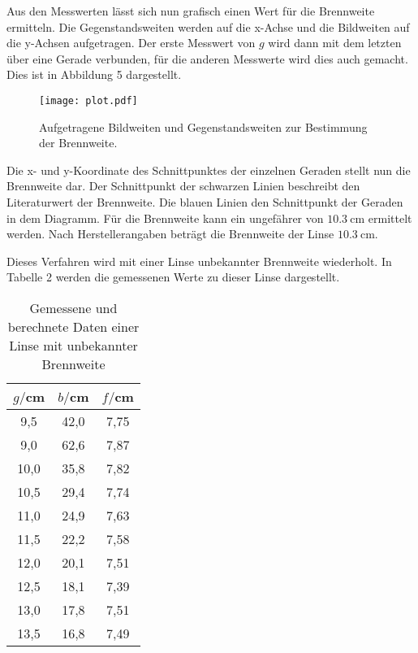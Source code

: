 Aus den Messwerten lässt sich nun grafisch einen Wert für die Brennweite ermitteln. Die Gegenstandsweiten
werden auf die x-Achse und die Bildweiten auf die y-Achsen aufgetragen. Der erste Messwert von $g$ wird dann mit
dem letzten über eine Gerade verbunden, für die anderen Messwerte wird dies auch gemacht. Dies ist in
Abbildung 5 dargestellt.




\begin{figure}[H]
  \centering
  \texttt{[image: plot.pdf]}
  \caption{Aufgetragene Bildweiten und Gegenstandsweiten zur Bestimmung der Brennweite.}
  \label{fig:plot}
\end{figure}


Die x- und y-Koordinate des Schnittpunktes der einzelnen Geraden stellt nun die Brennweite dar.
Der Schnittpunkt der schwarzen Linien beschreibt den Literaturwert der Brennweite. Die blauen Linien den Schnittpunkt der
Geraden in dem Diagramm. Für die Brennweite kann
ein ungefährer von $\SI{10.3}{\centi\meter}$ ermittelt werden. Nach Herstellerangaben beträgt die Brennweite der Linse $\SI{10.3}{\centi\meter}$.



Dieses Verfahren wird mit einer Linse unbekannter Brennweite wiederholt. In Tabelle 2 werden
die gemessenen Werte zu dieser Linse dargestellt.

\begin{table}[H]
  \centering
  \caption{Gemessene und berechnete Daten einer Linse mit unbekannter Brennweite}
  \label{tab:Widerstand}
  \begin{tabular}{c c c}
    \toprule
    $g/$cm  & $b/$cm & $f/$cm \\
    \midrule
    9,5     &     42,0 & 7,75 \\
    9,0     &     62,6 & 7,87 \\
    10,0    &     35,8 & 7,82 \\
    10,5    &     29,4 & 7,74 \\
    11,0    &     24,9 & 7,63 \\
    11,5    &     22,2 & 7,58 \\
    12,0    &     20,1 & 7,51 \\
    12,5    &     18,1 & 7,39 \\
    13,0    &     17,8 & 7,51 \\
    13,5    &     16,8 & 7,49 \\
    \bottomrule
  \end{tabular}
\end{table}

